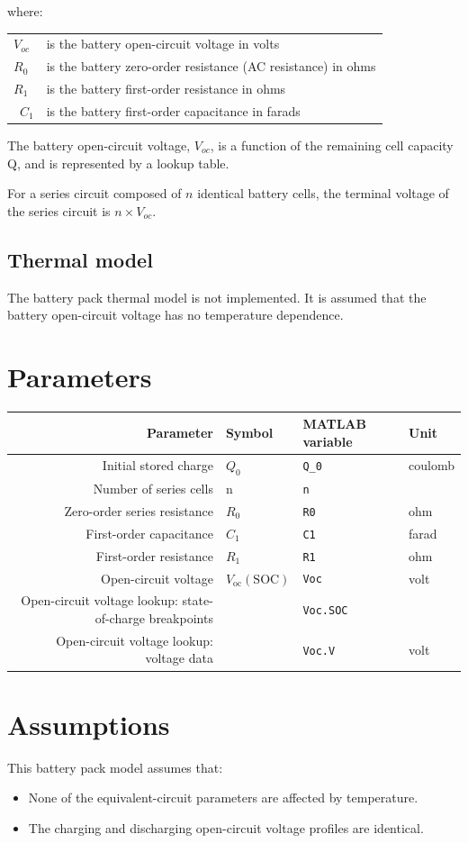 \documentclass[../SimBALink.tex]{subfiles}
\begin{document}
		where:
		\begin{center}
		\begin{tabular}{l l}
			$V_{oc}$		&	is the battery open-circuit voltage in volts	\\
			$R_{0}$		&	is the battery zero-order resistance (AC resistance) in ohms \\
			$R_{1}$		& 	is the battery first-order resistance in ohms \\\
			$C_{1}$		&	is the battery first-order capacitance in farads \\
		\end{tabular}
		\end{center}
		
		The battery open-circuit voltage, $V_{oc}$, is a function of the remaining cell capacity Q, and is represented by a lookup table.
		
		For a series circuit composed of $n$ identical battery cells, the terminal voltage of the series circuit is $n \times V_{oc}$.
		
	\subsection{Thermal model}
		The battery pack thermal model is not implemented. It is assumed that the battery open-circuit voltage has no temperature dependence.
		

\section{Parameters}
	\begin{tabular}{ r | l | l | l }
		Parameter				&	Symbol				&	MATLAB variable	&	Unit						\\	\hline	
		Initial stored charge			&	$Q_0$				&	\texttt{Q\_0}		&	coulomb					\\
		Number of series cells		&	n					&	\texttt{n}			&							\\
		Zero-order series resistance	&	$R_0$				&	\texttt{R0}			&	ohm						\\
		First-order capacitance		&	$C_1$				&	\texttt{C1}			&	farad					\\
		First-order resistance		&	$R_1$				&	\texttt{R1}			&	ohm						\\
		Open-circuit voltage			&	$V_\text{oc}(\text{SOC})$&	\texttt{Voc}		&	volt						\\
		Open-circuit voltage lookup: state-of-charge breakpoints	&		&	\texttt{Voc.SOC}	&							\\
		Open-circuit voltage lookup: voltage data	&			&	\texttt{Voc.V}		& 	volt
	\end{tabular}

\section{Assumptions}
	This battery pack model assumes that:
	
	\begin{itemize}
		\item		None of the equivalent-circuit parameters are affected by temperature.		
		\item		The charging and discharging open-circuit voltage profiles are identical.	
	\end{itemize}	
\end{document}
